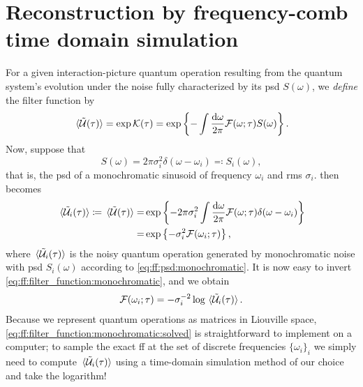 \section{Reconstruction by frequency-comb time domain simulation}\label{sec:ff:validation:method}
For a given interaction-picture quantum operation \liouvUetavg resulting from the quantum system's evolution under the noise fully characterized by its \gls{psd} $S(\omega)$, we \emph{define} the filter function \FFot by
\begin{align}\label{eq:ff:filter_function:definition}
    \liouvUetavg = \exp\cumulantfun(\tau) = \exp\left\{-\int\frac{\dd{\omega}}{2\pi}\FFot S(\omega)\right\}.
\end{align}
Now, suppose that
\begin{equation}\label{eq:ff:psd:monochromatic}
    S(\omega) = 2\pi\sigma_i^2 \delta(\omega - \omega_i) \eqqcolon S_i(\omega),
\end{equation}
that is, the \gls{psd} of a monochromatic sinusoid of frequency $\omega_i$ and \gls{rms} $\sigma_i$.
 then becomes
\begin{align}
    \ev*{\liouvUe_i(\tau)} \coloneqq \liouvUetavg =& \exp\left\lbrace -2\pi\sigma_i^2\int\frac{\dd{\omega}}{2\pi}\FFot\delta(\omega - \omega_i)\right\rbrace \\
                                                  =& \exp\left\lbrace -\sigma_i^2\mc{F}(\omega_i;\tau)\right\rbrace, \label{eq:ff:filter_function:monochromatic}
\end{align}
where $\ev*{\liouvUe_i(\tau)}$ is the noisy quantum operation generated by monochromatic noise with \gls{psd} $S_i(\omega)$ according to \cref{eq:ff:psd:monochromatic}.
It is now easy to invert \cref{eq:ff:filter_function:monochromatic}, and we obtain
\begin{align}\label{eq:ff:filter_function:monochromatic:solved}
    \mc{F}(\omega_i; \tau) = -\sigma_i^{-2}\log\ev*{\liouvUe_i(\tau)}.
\end{align}
Because we represent quantum operations as matrices in Liouville space, \cref{eq:ff:filter_function:monochromatic:solved} is straightforward to implement on a computer; to sample the exact \gls{ff} at the set of discrete frequencies $\lbrace\omega_i\rbrace_i$ we simply need to compute $\ev*{\liouvUe_i(\tau)}$  using a time-domain simulation method of our choice and take the logarithm!

